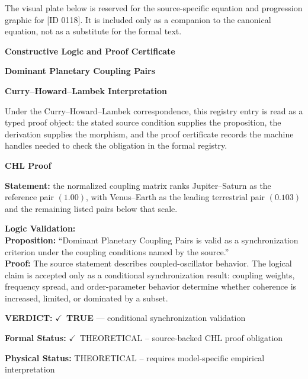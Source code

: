 \begingroup\footnotesize\sloppy
The visual plate below is reserved for the source-specific equation and progression graphic for [ID 0118]. It is included only as a companion to the canonical equation, not as a substitute for the formal text.
\par\endgroup
\ifTZPDarkEdition
{}
\fi

\clearpage
\begingroup\tzpsupportsetup
\noindent\textbf{\fontsize{10.8pt}{12.8pt}\selectfont [ID 0118] Constructive Logic and Proof Certificate}\par
\noindent\textbf{\fontsize{10pt}{12pt}\selectfont Dominant Planetary Coupling Pairs}\par
\vspace{0.45em}
\begingroup
\footnotesize
\setlength{\parskip}{0.22em}
\setlength{\parindent}{0pt}
\noindent\textbf{Curry--Howard--Lambek Interpretation}\par
Under the Curry--Howard--Lambek correspondence, this registry entry is read as a typed proof
object: the stated source condition supplies the proposition, the derivation supplies the
morphism, and the proof certificate records the machine handles needed to check the obligation
in the formal registry.

\vspace{0.45em}
\noindent\textbf{CHL Proof}\par
\textbf{Statement:} the normalized coupling matrix ranks Jupiter--Saturn as the reference pair
\((1.00)\), with Venus--Earth as the leading terrestrial pair \((0.103)\) and the remaining listed pairs below that scale.

\textbf{Logic Validation:}\\
\textbf{Proposition:} ``Dominant Planetary Coupling Pairs is valid as a synchronization criterion under the
coupling conditions named by the source.''\\
\textbf{Proof:} The source statement describes coupled-oscillator behavior. The logical claim is
accepted only as a conditional synchronization result: coupling weights, frequency
spread, and order-parameter behavior determine whether coherence is increased, limited,
or dominated by a subset.

\textbf{VERDICT:} \ensuremath{\checkmark}\ \textbf{TRUE} --- conditional synchronization validation

\textbf{Formal Status:} \ensuremath{\checkmark}\ THEORETICAL -- source-backed CHL proof obligation

\textbf{Physical Status:} THEORETICAL -- requires model-specific empirical interpretation
\par\vspace{0.45em}
\par
\ifTZPDarkEdition
{}
\fi
\endgroup
\endgroup
